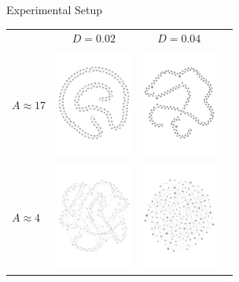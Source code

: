 \documentclass[12pt, handout=show,notes=show]{beamer}
\begin{document}
\begin{frame}{Experimental Setup}
    \begin{table}
	\centering
	\begin{tabular}{lccc}
	    	&$D=0.02$ & $D=0.04$\\
		$A\approx17$&
		\includegraphics[width=2.5cm]{images//g02.pdf}&
		\includegraphics[width=2.5cm]{images//g00.pdf}\\
		$A\approx4$&
		\includegraphics[width=2.5cm]{images/g42.pdf}&
		\includegraphics[width=2.5cm]{images/g40.pdf}\\
	\end{tabular}
    \end{table}
\end{frame}
\end{document}
